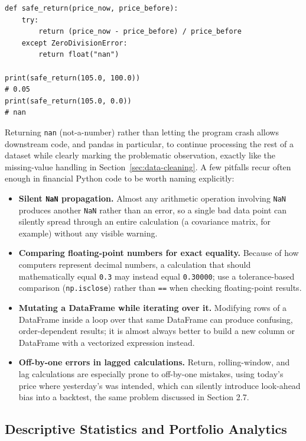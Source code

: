 \documentclass[../ai_in_finance]{subfiles}
\begin{document}
\begin{verbatim}
def safe_return(price_now, price_before):
    try:
        return (price_now - price_before) / price_before
    except ZeroDivisionError:
        return float("nan")

print(safe_return(105.0, 100.0))
# 0.05
print(safe_return(105.0, 0.0))
# nan
\end{verbatim}

Returning \texttt{nan} (not-a-number) rather than letting the program crash allows downstream code, and pandas in particular, to continue processing the rest of a dataset while clearly marking the problematic observation, exactly like the missing-value handling in Section~\ref{sec:data-cleaning}. A few pitfalls recur often enough in financial Python code to be worth naming explicitly:

\begin{itemize}
    \item \textbf{Silent \texttt{NaN} propagation.} Almost any arithmetic operation involving \texttt{NaN} produces another \texttt{NaN} rather than an error, so a single bad data point can silently spread through an entire calculation (a covariance matrix, for example) without any visible warning.
    \item \textbf{Comparing floating-point numbers for exact equality.} Because of how computers represent decimal numbers, a calculation that should mathematically equal \texttt{0.3} may instead equal \texttt{0.30000}; use a tolerance-based comparison (\texttt{np.isclose}) rather than \texttt{==} when checking floating-point results.
    \item \textbf{Mutating a DataFrame while iterating over it.} Modifying rows of a DataFrame inside a loop over that same DataFrame can produce confusing, order-dependent results; it is almost always better to build a new column or DataFrame with a vectorized expression instead.
    \item \textbf{Off-by-one errors in lagged calculations.} Return, rolling-window, and lag calculations are especially prone to off-by-one mistakes, using today's price where yesterday's was intended, which can silently introduce look-ahead bias into a backtest, the same problem discussed in Section 2.7.
\end{itemize}

\subsection{Descriptive Statistics and Portfolio Analytics}
\end{document}
